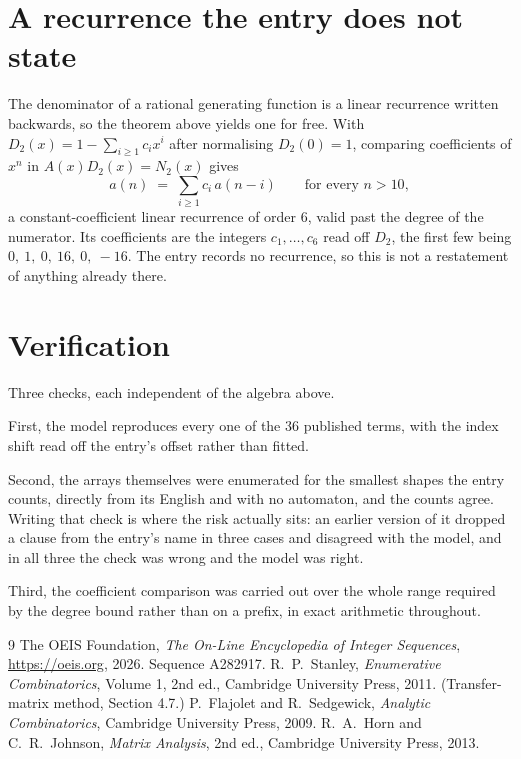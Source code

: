 \documentclass[11pt,a4paper]{article}
\theoremstyle{plain}
\theoremstyle{definition}
\begin{document}
\section{A recurrence the entry does not state}

The denominator of a rational generating function is a linear recurrence written backwards, so
the theorem above yields one for free. With $D_2(x)=1-\sum_{i\ge1}c_ix^i$ after normalising
$D_2(0)=1$, comparing coefficients of $x^n$ in $A(x)D_2(x)=N_2(x)$ gives
\[
a(n)\;=\;\sum_{i\ge1}c_i\,a(n-i)\qquad\text{for every }n>10,
\]
a constant-coefficient linear recurrence of order $6$, valid past the degree of the
numerator. Its coefficients are the integers $c_1,\dots,c_{6}$ read off $D_2$, the first few being $0,\ 1,\ 0,\ 16,\ 0,\ -16$. The entry records no recurrence, so this is not a restatement of anything
already there.

\section{Verification}

Three checks, each independent of the algebra above.

First, the model reproduces every one of the $36$ published terms, with the index shift
read off the entry's offset rather than fitted.

Second, the arrays themselves were enumerated for the smallest shapes the entry counts,
directly from its English and with no automaton, and the counts agree. Writing that check is
where the risk actually sits: an earlier version of it dropped a clause from the entry's name
in three cases and disagreed with the model, and in all three the check was wrong and the model
was right.

Third, the coefficient comparison was carried out over the whole range required by the degree
bound rather than on a prefix, in exact arithmetic throughout.

\begin{thebibliography}{9}
 The OEIS Foundation, \emph{The On-Line Encyclopedia of Integer
Sequences}, \url{https://oeis.org}, 2026. Sequence A282917.
 R.~P.~Stanley, \emph{Enumerative Combinatorics}, Volume 1, 2nd ed.,
Cambridge University Press, 2011. (Transfer-matrix method, Section 4.7.)
 P.~Flajolet and R.~Sedgewick, \emph{Analytic Combinatorics}, Cambridge
University Press, 2009.
 R.~A.~Horn and C.~R.~Johnson, \emph{Matrix Analysis}, 2nd ed., Cambridge
University Press, 2013.
\end{thebibliography}
\end{document}

